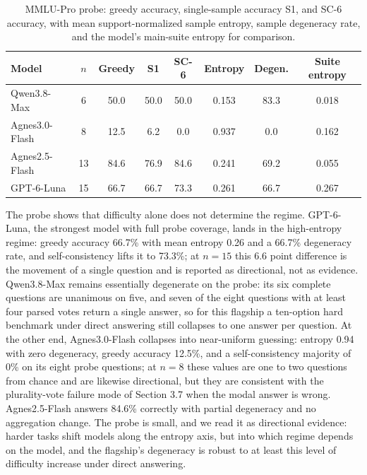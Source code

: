 \documentclass[preprint,12pt]{elsarticle}
\begin{document}
\begin{table}[htbp]
\centering
\footnotesize
\caption{MMLU-Pro probe: greedy accuracy, single-sample accuracy S1, and SC-6 accuracy, with mean support-normalized sample entropy, sample degeneracy rate, and the model's main-suite entropy for comparison.}

\footnotesize
\begin{tabular}{l c c c c c c c}
\toprule
Model & $n$ & Greedy & S1 & SC-6 & Entropy & Degen. & Suite entropy \\
\midrule
Qwen3.8-Max & 6 & 50.0 & 50.0 & 50.0 & 0.153 & 83.3 & 0.018 \\
Agnes3.0-Flash & 8 & 12.5 & 6.2 & 0.0 & 0.937 & 0.0 & 0.162 \\
Agnes2.5-Flash & 13 & 84.6 & 76.9 & 84.6 & 0.241 & 69.2 & 0.055 \\
GPT-6-Luna & 15 & 66.7 & 66.7 & 73.3 & 0.261 & 66.7 & 0.267 \\
\bottomrule
\end{tabular}
\end{table}

The probe shows that difficulty alone does not determine the regime. GPT-6-Luna, the strongest model with full probe coverage, lands in the high-entropy regime: greedy accuracy 66.7\% with mean entropy 0.26 and a 66.7\% degeneracy rate, and self-consistency lifts it to 73.3\%; at $n = 15$ this 6.6 point difference is the movement of a single question and is reported as directional, not as evidence. Qwen3.8-Max remains essentially degenerate on the probe: its six complete questions are unanimous on five, and seven of the eight questions with at least four parsed votes return a single answer, so for this flagship a ten-option hard benchmark under direct answering still collapses to one answer per question. At the other end, Agnes3.0-Flash collapses into near-uniform guessing: entropy 0.94 with zero degeneracy, greedy accuracy 12.5\%, and a self-consistency majority of 0\% on its eight probe questions; at $n = 8$ these values are one to two questions from chance and are likewise directional, but they are consistent with the plurality-vote failure mode of Section 3.7 when the modal answer is wrong. Agnes2.5-Flash answers 84.6\% correctly with partial degeneracy and no aggregation change. The probe is small, and we read it as directional evidence: harder tasks shift models along the entropy axis, but into which regime depends on the model, and the flagship's degeneracy is robust to at least this level of difficulty increase under direct answering.
\end{document}
